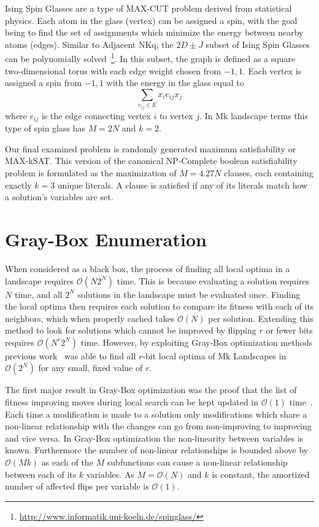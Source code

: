 \documentclass[runningheads,a4paper]{llncs}
\newcommand{\BigO}[1]{$\mathcal{O}{(#1)}$}
\begin{document}
Ising Spin Glasses are a type of MAX-CUT problem derived from statistical physics.
Each atom in the glass (vertex) can be assigned a spin, with the goal being to
find the set of assignments which minimize the energy between nearby atoms (edges).
Similar to Adjacent NKq, the $2D\pm J$ subset of Ising Spin Glasses can be polynomially
solved~\cite{saul:1994:spinglass}\footnote{\url{http://www.informatik.uni-koeln.de/spinglass/}}.
In this subset, the graph is defined as a square two-dimensional torus with each edge
weight chosen from ${-1, 1}$. Each vertex is assigned a spin from ${-1, 1}$ with
the energy in the glass equal to
\begin{equation}
\sum_{e_{ij} \in E} x_ie_{ij}x_j
  \label{eq-ising}
\end{equation}
where $e_{ij}$ is the edge connecting vertex $i$ to vertex $j$. In Mk landscape terms
this type of spin glass has $M=2N$ and $k=2$.

Our final examined problem is randomly generated maximum satisfiability or MAX-kSAT.
This version of the canonical NP-Complete boolean satisfiability problem is formulated
as the maximization of $M=4.27N$ clauses, each containing exactly $k=3$ unique literals.
A clause is satisfied if any of its literals match how a solution's variables are set.

\section{Gray-Box Enumeration}
When considered as a black box, the process of finding all local optima
in a landscape requires \BigO{N2^N} time. This is because evaluating
a solution requires $N$ time, and all $2^N$ solutions in the landscape
must be evaluated once. Finding the local
optima then requires each solution to compare its fitness with each
of its neighbors, which when properly cached takes \BigO{N} per solution.
Extending this method to look for solutions which cannot be improved by
flipping $r$ or fewer bits requires \BigO{N^r2^N} time. However,
by exploiting Gray-Box optimization methods previous work~\cite{ochoa:2015:crossovernetworks}
was able to find all $r$-bit local optima of Mk Landscapes in \BigO{2^N} for any small,
fixed value of $r$.

The first major result in Gray-Box optimization was the proof that the list
of fitness improving moves during local search can be kept updated in \BigO{1}
time~\cite{whitley:2012:constant}. Each time a modification is made to a solution
only modifications which share a non-linear relationship with the changes can
go from non-improving to improving and vice versa. In Gray-Box optimization
the non-linearity between variables is known. Furthermore the number of
non-linear relationships is bounded above by \BigO{Mk} as each of the $M$
subfunctions can cause a non-linear relationship between each of its $k$
variables. As $M=$\BigO{N} and $k$ is constant, the amortized number of affected
flips per variable is \BigO{1}.
\end{document}
